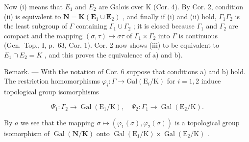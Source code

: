 Now (i) means that \(E_{1}\) and \(E_{2}\) are Galois over K (Cor. 4). By Cor. 2, condition (ii) is equivalent to \(\mathbf{N} = \mathbf{K}(\mathbf{E}_{1} \cup \mathbf{E}_{2})\) , and finally if (i) and (ii) hold, \(\Gamma_{1}\Gamma_{2}\) is the least subgroup of \(\Gamma\) containing \(\Gamma_{1} \cup \Gamma_{2}\) ; it is closed because \(\Gamma_{1}\) and \(\Gamma_{2}\) are compact and the mapping \((\sigma, \tau) \mapsto \sigma\tau\) of \(\Gamma_{1} \times \Gamma_{2}\) into \(\Gamma\) is continuous (Gen.~Top., I, p.~63, Cor. 1). Cor. 2 now shows (iii) to be equivalent to \(E_{1} \cap E_{2} = K\) , and this proves the equivalence of a) and b).

Remark. --- With the notation of Cor. 6 suppose that conditions a) and b) hold. The restriction homomorphisms \(\varphi_{i}:\Gamma\to\mathrm{Gal}(\mathrm{E}_{i}/\mathrm{K})\) for \(i=1,2\) induce topological group isomorphisms

\[
\Psi_ {1}: \Gamma_ {2} \rightarrow \operatorname{Gal} \left(\mathrm{E} _ {1} / \mathrm{K}\right), \quad \Psi_ {2}: \Gamma_ {1} \rightarrow \operatorname{Gal} \left(\mathrm{E} _ {2} / \mathrm{K}\right).
\]

By \(a\) we see that the mapping \(\sigma \mapsto (\varphi_1(\sigma), \varphi_2(\sigma))\) is a topological group isomorphism of \(\operatorname{Gal}(\mathbf{N}/\mathbf{K})\) onto \(\operatorname{Gal}(\mathrm{E}_1/\mathrm{K}) \times \operatorname{Gal}(\mathrm{E}_2/\mathrm{K})\) .
\relax{}
